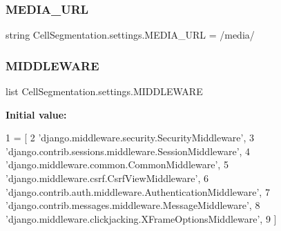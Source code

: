 \mbox{\label{namespace_cell_segmentation_1_1settings_afcfd924da96d24487cefb726d70ba95f}} 
\subsubsection{\texorpdfstring{M\+E\+D\+I\+A\+\_\+\+U\+RL}{MEDIA\_URL}}
{\footnotesize\ttfamily string Cell\+Segmentation.\+settings.\+M\+E\+D\+I\+A\+\_\+\+U\+RL = \textquotesingle{}/media/\textquotesingle{}}

\mbox{\label{namespace_cell_segmentation_1_1settings_a9d3647228b19e6473eb9573388ea2c04}} 
\subsubsection{\texorpdfstring{M\+I\+D\+D\+L\+E\+W\+A\+RE}{MIDDLEWARE}}
{\footnotesize\ttfamily list Cell\+Segmentation.\+settings.\+M\+I\+D\+D\+L\+E\+W\+A\+RE}

{\bfseries Initial value\+:}
\begin{DoxyCode}
1 =  [
2     \textcolor{stringliteral}{'django.middleware.security.SecurityMiddleware'},
3     \textcolor{stringliteral}{'django.contrib.sessions.middleware.SessionMiddleware'},
4     \textcolor{stringliteral}{'django.middleware.common.CommonMiddleware'},
5     \textcolor{stringliteral}{'django.middleware.csrf.CsrfViewMiddleware'},
6     \textcolor{stringliteral}{'django.contrib.auth.middleware.AuthenticationMiddleware'},
7     \textcolor{stringliteral}{'django.contrib.messages.middleware.MessageMiddleware'},
8     \textcolor{stringliteral}{'django.middleware.clickjacking.XFrameOptionsMiddleware'},
9 ]
\end{DoxyCode}
\mbox{\label{namespace_cell_segmentation_1_1settings_a0ad4c6f092c3f89b3a1cdc675dd6c1f8}} 
